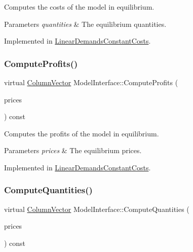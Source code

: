 Computes the costs of the model in equilibrium.


\begin{DoxyParams}{Parameters}
{\em quantities} & The equilibrium quantities. \\
\hline
\end{DoxyParams}


Implemented in \hyperlink{classLinearDemandsConstantCosts_a55e0f15cfc00d8c21fbfd95843c06c44}{Linear\+Demands\+Constant\+Costs}.

\mbox{\label{classModelInterface_a311a000060cece8fc1058cd27bf07864}} 
\subsubsection{\texorpdfstring{Compute\+Profits()}{ComputeProfits()}}
{\footnotesize\ttfamily virtual \hyperlink{classColumnVector}{Column\+Vector} Model\+Interface\+::\+Compute\+Profits (\begin{DoxyParamCaption}\item[{\hyperlink{classColumnVector}{Column\+Vector} const \&}]{prices }\end{DoxyParamCaption}) const\hspace{0.3cm}{\ttfamily [pure virtual]}}

Computes the profits of the model in equilibrium.


\begin{DoxyParams}{Parameters}
{\em prices} & The equilibrium prices. \\
\hline
\end{DoxyParams}


Implemented in \hyperlink{classLinearDemandsConstantCosts_a48b52dab01d2cf45beae51eab615f7ae}{Linear\+Demands\+Constant\+Costs}.

\mbox{\label{classModelInterface_af9a936f6f0d1b1f0f2c5bf35785e7db4}} 
\subsubsection{\texorpdfstring{Compute\+Quantities()}{ComputeQuantities()}}
{\footnotesize\ttfamily virtual \hyperlink{classColumnVector}{Column\+Vector} Model\+Interface\+::\+Compute\+Quantities (\begin{DoxyParamCaption}\item[{\hyperlink{classColumnVector}{Column\+Vector} const \&}]{prices }\end{DoxyParamCaption}) const\hspace{0.3cm}{\ttfamily [pure virtual]}}

